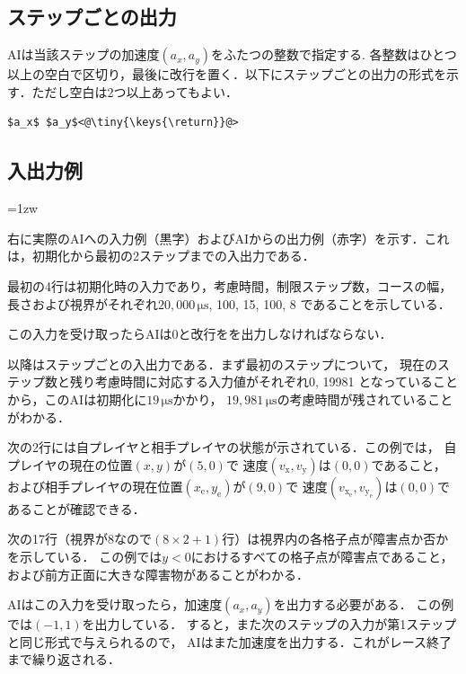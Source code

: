 \documentclass[11pt]{jarticle}
\begin{document}
\subsection{ステップごとの出力}\label{sec:output_step}
AIは当該ステップの加速度$(a_x,a_y)$をふたつの整数で指定する.
各整数はひとつ以上の空白で区切り，最後に改行を置く．以下にステップごとの出力の形式を示す．ただし空白は2つ以上あってもよい．

\begin{lstlisting}
$a_x$ $a_y$<@\tiny{\keys{\return}}@>
\end{lstlisting}

\subsection{入出力例}

\begin{minipage}[t]{.6\textwidth}

\parindent=1zw

右に実際のAIへの入力例（黒字）およびAIからの出力例（赤字）を示す．これは，初期化から最初の2ステップまでの入出力である．

最初の4行は初期化時の入力であり，考慮時間，制限ステップ数，コースの幅，
長さおよび視界がそれぞれ$20,000\,\si{\micro\second}$, 100, 15, 100, 8
であることを示している．

この入力を受け取ったらAIは0と改行をを出力しなければならない．

以降はステップごとの入出力である．まず最初のステップについて，
現在のステップ数と残り考慮時間に対応する入力値がそれぞれ0, 19981
となっていることから，このAIは初期化に$19\,\si{\micro\second}$かかり，
$19,981\,\si{\micro\second}$の考慮時間が残されていることがわかる．

次の2行には自プレイヤと相手プレイヤの状態が示されている．この例では，
自プレイヤの現在の位置$(x,y)$が$(5,0)$で
速度$(v_\mathrm{x},v_\mathrm{y})$は$(0,0)$であること，
および相手プレイヤの現在位置$(x_\mathrm{e},y_\mathrm{e})$が$(9,0)$で
速度$(v_{\mathrm{x}_\mathrm{e}},v_{\mathrm{y}_\mathrm{e}})$は$(0,0)$であることが確認できる．

次の17行（視界が$8$なので$(8 \times 2 + 1)$行）は視界内の各格子点が障害点か否かを示している．
この例では$y < 0$におけるすべての格子点が障害点であること，
および前方正面に大きな障害物があることがわかる．

AIはこの入力を受け取ったら，加速度$(a_x, a_y)$を出力する必要がある．
この例では$(-1, 1)$を出力している．
すると，また次のステップの入力が第1ステップと同じ形式で与えられるので，
AIはまた加速度を出力する．これがレース終了まで繰り返される．

\end{minipage}
\end{document}
